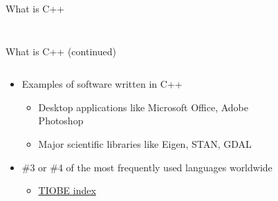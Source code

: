 \documentclass{beamer}
\begin{document}
\begin{frame}{What is C++}
\begin{columns}
\begin{column}{0.5\textwidth}
\begin{figure}
            \end{figure}
        \end{column}
    \end{columns}
\end{frame}
\begin{frame}{What is C++ (continued)}
    \begin{columns}
        \begin{column}{0.5\textwidth}
            \begin{itemize}
                \item<1-> Examples of software written in C++
                    \begin{itemize}
                        \item Desktop applications like Microsoft Office, Adobe Photoshop
                        \item Major scientific libraries like Eigen, STAN, GDAL
                    \end{itemize}
                \item<2-> \#3 or \#4 of the most frequently used languages worldwide
                    \begin{itemize}
                        \item \href{https://www.tiobe.com/tiobe-index/}{TIOBE index}
                    \end{itemize}
            \end{itemize}
        \end{column}
        \begin{column}{0.5\textwidth}
            \begin{figure}
            \end{figure}
        \end{column}
    \end{columns}
\end{frame}
\end{document}
